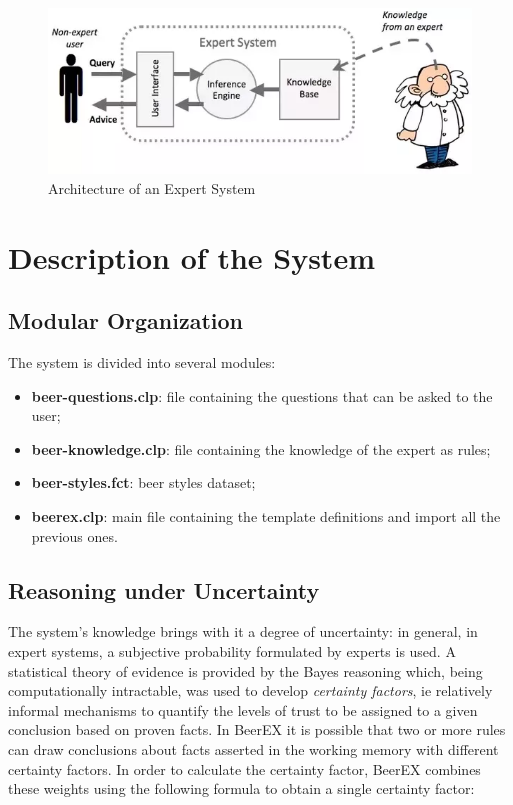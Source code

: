 \documentclass[12pt]{article}
\begin{document}
\begin{figure}[h]
\centering
\includegraphics[scale = 0.6]{img/arch.png}
\caption{Architecture of an Expert System}
\end{figure}

\section{Description of the System}

\subsection{Modular Organization}

The system is divided into several modules:
\begin{itemize}
\item \textbf{beer-questions.clp}: file containing the questions that can be asked to the user;
\item \textbf{beer-knowledge.clp}: file containing the knowledge of the expert as rules;
\item \textbf{beer-styles.fct}: beer styles dataset;
\item \textbf{beerex.clp}: main file containing the template definitions and import all the previous ones.
\end{itemize}

\subsection{Reasoning under Uncertainty}

The system's knowledge brings with it a degree of uncertainty: in general, in expert systems, a subjective probability formulated by experts is used. A statistical theory of evidence is provided by the Bayes reasoning which, being computationally intractable, was used to develop \textit{certainty factors}, ie relatively informal mechanisms to quantify the levels of trust to be assigned to a given conclusion based on proven facts. In BeerEX it is possible that two or more rules can draw conclusions about facts asserted in the working memory with different certainty factors. In order to calculate the certainty factor, BeerEX combines these weights using the following formula to obtain a single certainty factor:
\end{document}
